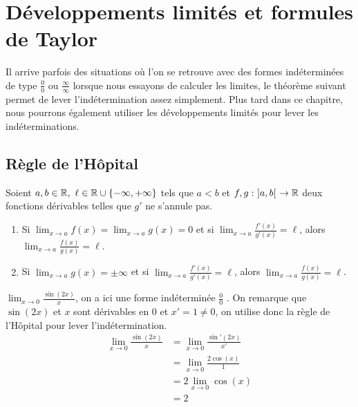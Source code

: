 \chapter{Développements limités et formules de Taylor}
\def\arraystretch{1}

\par Il arrive parfois des situations où l'on se retrouve avec des formes indéterminées de type \og $\frac{0}{0}$ \fg ou \og $\frac{\infty}{\infty}$ \fg lorsque nous essayons de calculer les limites, le théorème suivant permet de lever l'indétermination assez simplement.
Plus tard dans ce chapitre, nous pourrons également utiliser les développements limités pour lever les indéterminations.
\section{Règle de l'Hôpital}
\begin{theorem}
    Soient $a, b \in \mathbb{R},\ \ell \in \mathbb{R} \cup \{-\infty, +\infty\}$ tels que $a < b$ et $f, g : \ ]a, b[ \ \to \mathbb{R}$ deux fonctions dérivables telles que $g'$ ne s'annule pas. 
    \begin{enumerate}
        \item Si $\lim_{x \to a} f(x) = \lim_{x \to a} g(x) = 0$ et si $\lim_{x \to a} \frac{f'(x)}{g'(x)} = \ell$, alors $\lim_{x \to a} \frac{f(x)}{g(x)} = \ell$.
        \item Si $\lim_{x \to a} g(x) = \pm \infty$ et si $\lim_{x \to a} \frac{f'(x)}{g'(x)} = \ell$, alors $\lim_{x \to a} \frac{f(x)}{g(x)} = \ell$.
    \end{enumerate}
\end{theorem}

\begin{example}
    $\lim_{x \to 0} \frac{\sin(2x)}{x}$, on a ici une forme indéterminée \og $\frac{0}{0}$ \fg.
    On remarque que $\sin(2x)$ et $x$ sont dérivables en 0 et $x' = 1 \neq 0$, on utilise donc la règle de l'Hôpital pour lever l'indétermination.
    \begin{align*}
        \lim_{x \to 0} \frac{\sin(2x)}{x} &= \lim_{x \to 0} \frac{\sin'(2x)}{x'} \\
        &= \lim_{x \to 0} \frac{2 \cos(x)}{1} \\
        &= 2 \lim_{x \to 0} \cos(x) \\
        &= 2
    \end{align*}
\end{example}

